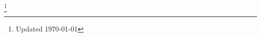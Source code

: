 \documentclass[margin]{res}
\begin{document}
\begin{resume}





\end{resume}
\let\thefootnote\relax\footnote{Updated \today}
\end{document}

